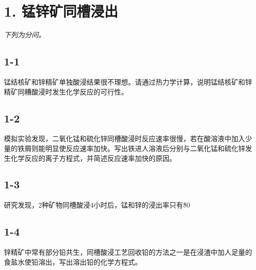 \section*{1. 锰锌矿同槽浸出}
\textit{下列为分问。}

\subsection*{1-1}
锰结核矿和锌精矿单独酸浸结果很不理想。请通过热⼒学计算，说明锰结核矿和锌精矿同糟酸浸时发⽣化学反应的可⾏性。

\subsection*{1-2}
模拟实验发现，⼆氧化锰和硫化锌同槽酸浸时反应速率很慢，若在酸溶液中加⼊少量的铁屑则能明显使反应速率加快。写出铁进⼈溶液后分别与⼆氧化锰和硫化锌发⽣化学反应的离⼦⽅程式，并简述反应速率加快的原因。

\subsection*{1-3}
研究发现，2种矿物同槽酸浸4⼩时后，锰和锌的浸出率只有\~80%

\subsection*{1-4}
锌精矿中常有部分铅共⽣，同槽酸浸⼯艺回收铅的⽅法之⼀是在浸渣中加⼈⾜量的⻝盐⽔使铅溶出，写出溶出铅的化学⽅程式。
